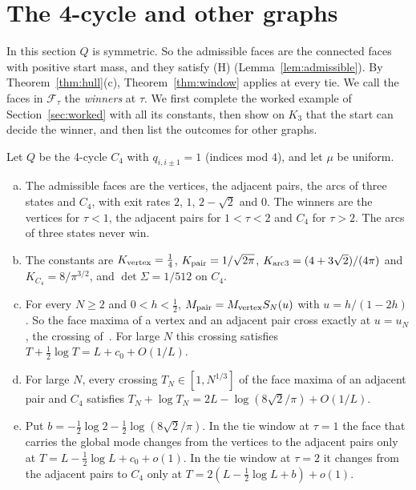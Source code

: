 \section{The 4-cycle and other graphs}\label{sec:examples}

In this section $Q$ is symmetric. So the admissible faces are the connected
faces with positive start mass, and they satisfy (H)
(Lemma~\ref{lem:admissible}). By Theorem~\ref{thm:hull}(c),
Theorem~\ref{thm:window} applies at every tie. We call the faces in
$\mathcal F_\tau$ the \emph{winners} at $\tau$. We first complete the worked
example of Section~\ref{sec:worked} with all its constants, then show on $K_3$
that the start can decide the winner, and then list the outcomes for other
graphs.

\begin{corollary}\label{cor:C4}
Let $Q$ be the 4-cycle $C_4$ with $q_{i,i\pm1}=1$ (indices mod $4$), and let
$\mu$ be uniform.
\begin{enumerate}[(a)]
\item The admissible faces are the vertices, the adjacent pairs, the arcs of
three states and $C_4$, with exit rates $2$, $1$, $2-\sqrt2$ and $0$. The
winners are the vertices for $\tau<1$, the adjacent pairs for $1<\tau<2$ and
$C_4$ for $\tau>2$. The arcs of three states never win.
\item The constants are $K_{\rm vertex}=\frac14$, $K_{\rm pair}=1/\sqrt{2\pi}$,
$K_{\rm arc3}=(4+3\sqrt2)/(4\pi)$ and $K_{C_4}=8/\pi^{3/2}$, and
$\det\Sigma=1/512$ on $C_4$.
\item For every $N\ge2$ and $0<h<\frac12$, $M_{\rm pair}=M_{\rm vertex}S_N(u)$
with $u=h/(1-2h)$. So the face maxima of a vertex and an adjacent pair cross
exactly at $u=u_N$, the crossing of~\cite{paperA}. For large $N$ this
crossing satisfies $T+\frac12\log T=L+c_0+O(1/L)$.
\item For large $N$, every crossing $T_N\in[1,N^{1/3}]$ of the face maxima of
an adjacent pair and $C_4$ satisfies $T_N+\log T_N=2L-\log(8\sqrt2/\pi)+O(1/L)$.
\item Put $b=-\frac12\log2-\frac12\log(8\sqrt2/\pi)$. In the tie window at
$\tau=1$ the face that carries the global mode changes from the vertices to
the adjacent pairs only at $T=L-\frac12\log L+c_0+o(1)$. In the tie window at
$\tau=2$ it changes from the adjacent pairs to $C_4$ only at
$T=2(L-\frac12\log L+b)+o(1)$.
\end{enumerate}
\end{corollary}


